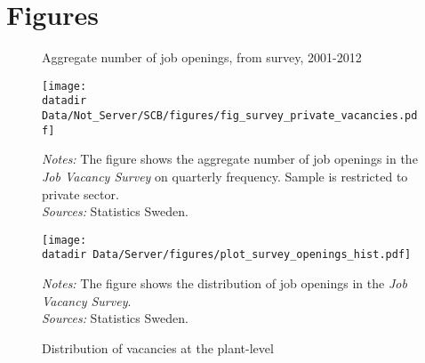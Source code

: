\section{Figures}
\label{sec:figures}



\begin{figure}[h]
\centering
\caption{Aggregate number of job openings, from survey, 2001-2012}
\texttt{[image: \\datadir Data/Not\_Server/SCB/figures/fig\_survey\_private\_vacancies.pdf]}
\begin{flushleft}
\footnotesize{\emph{Notes:} The figure shows the aggregate number of job openings in the \emph{Job Vacancy Survey} on quarterly frequency. Sample is restricted to private sector.} \\ 
\footnotesize{\emph{Sources:} Statistics Sweden.} 
\label{fig:survey_openings_timeserie}
\end{flushleft}
\vspace{3mm}
\centering
\caption{Distribution of vacancies at the plant-level}
\texttt{[image: \\datadir Data/Server/figures/plot\_survey\_openings\_hist.pdf]}
\begin{flushleft}
\footnotesize{\emph{Notes:} The figure shows the distribution of job openings in the \emph{Job Vacancy Survey}.} \\ 
\footnotesize{\emph{Sources:} Statistics Sweden.}
\label{fig:survey_openings_hist}
\end{flushleft}
\end{figure}

